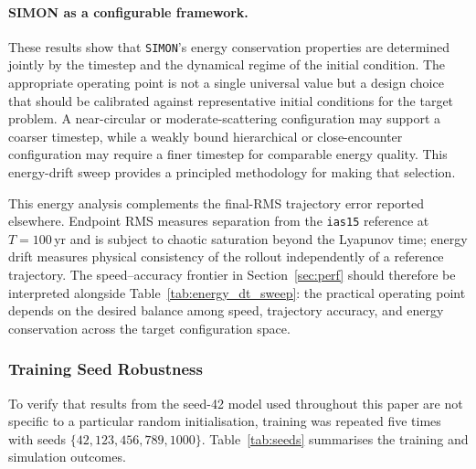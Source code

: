 \documentclass[12pt]{article}
\begin{document}
\paragraph{SIMON as a configurable framework.}
These results show that \texttt{SIMON}'s energy conservation properties are
determined jointly by the timestep and the dynamical regime of the
initial condition. The appropriate operating point is not a single
universal value but a design choice that should be calibrated against
representative initial conditions for the target problem. A
near-circular or moderate-scattering configuration may support a
coarser timestep, while a weakly bound hierarchical or
close-encounter configuration may require a finer timestep for
comparable energy quality. This energy-drift sweep provides a
principled methodology for making that selection.

This energy analysis complements the final-RMS trajectory error
reported elsewhere. Endpoint RMS measures separation from the
\texttt{ias15} reference at $T=100$\,yr and is subject to chaotic
saturation beyond the Lyapunov time; energy drift measures physical
consistency of the rollout independently of a reference trajectory.
The speed--accuracy frontier in Section~\ref{sec:perf} should
therefore be interpreted alongside
Table~\ref{tab:energy_dt_sweep}: the practical operating point
depends on the desired balance among speed, trajectory accuracy, and
energy conservation across the target configuration space.

\subsubsection{Training Seed Robustness}
\label{sec:seed_robustness}

To verify that results from the seed-42 model used throughout this paper are
not specific to a particular random initialisation, training was repeated five times
with seeds $\{42, 123, 456, 789, 1000\}$. Table~\ref{tab:seeds} summarises the
training and simulation outcomes.
\end{document}
